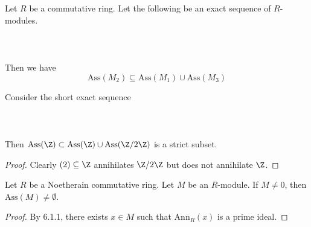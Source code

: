 \documentclass[a4paper]{article}
\begin{document}
\begin{prp}{}{} Let $R$ be a commutative ring. Let the following be an exact sequence of $R$-modules. \\~\\
\\~\\
Then we have $$\text{Ass}(M_2)\subseteq\text{Ass}(M_1)\cup\text{Ass}(M_3)$$
\end{prp}

\begin{eg}{}{} Consider the short exact sequence \\~\\
\\~\\
Then $\text{Ass}(\Z)\subset\text{Ass}(\Z)\cup\text{Ass}(\Z/2\Z)$ is a strict subset. \tcbline
\begin{proof}
Clearly $(2)\subseteq\Z$ annihilates $\Z/2\Z$ but does not annihilate $\Z$. 
\end{proof}
\end{eg}

\begin{lmm}{}{} Let $R$ be a Noetherain commutative ring. Let $M$ be an $R$-module. If $M\neq 0$, then $\text{Ass}(M)\neq\emptyset$. \tcbline
\begin{proof}
By 6.1.1, there exists $x\in M$ such that $\text{Ann}_R(x)$ is a prime ideal. 
\end{proof}
\end{lmm}
\end{document}
